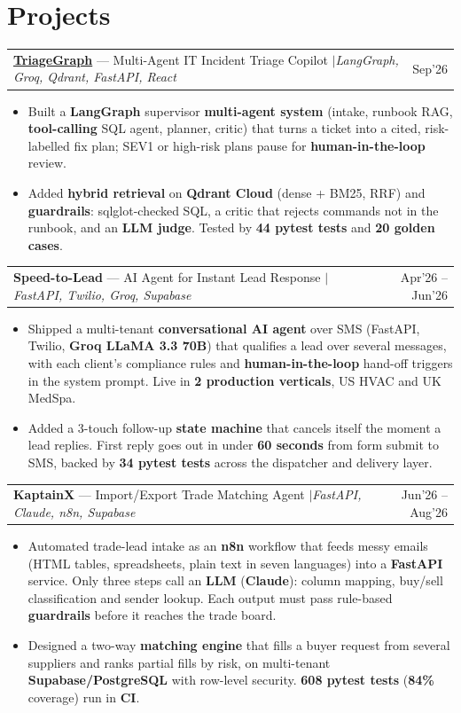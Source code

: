\documentclass[a4paper,10pt]{article}
\makeatletter
\newcommand{\entrygap}{\vspace{5pt}}
\newcommand{\sep}{\unskip\hspace{0.5em}$|$\hspace{0.5em}\ignorespaces}
\newcommand{\entry}[2]{%
  \begin{tabularx}{\linewidth}{@{}Xr@{}}#1 & #2\end{tabularx}\par}
\makeatother
\begin{document}
\section*{Projects}

\entry{\href{https://github.com/USERNAME/triagegraph}{\textbf{TriageGraph}} --- Multi-Agent IT Incident Triage Copilot \sep \textit{LangGraph, Groq, Qdrant, FastAPI, React}}{Sep'26}
\begin{itemize}
    \item Built a \textbf{LangGraph} supervisor \textbf{multi-agent system} (intake, runbook RAG, \textbf{tool-calling} SQL agent, planner, critic) that turns a ticket into a cited, risk-labelled fix plan; SEV1 or high-risk plans pause for \textbf{human-in-the-loop} review.
    \item Added \textbf{hybrid retrieval} on \textbf{Qdrant Cloud} (dense + BM25, RRF) and \textbf{guardrails}: sqlglot-checked SQL, a critic that rejects commands not in the runbook, and an \textbf{LLM judge}. Tested by \textbf{44 pytest tests} and \textbf{20 golden cases}.
\end{itemize}
\entrygap
\entry{\textbf{Speed-to-Lead} --- AI Agent for Instant Lead Response \sep \textit{FastAPI, Twilio, Groq, Supabase}}{Apr'26 -- Jun'26}
\begin{itemize}
    \item Shipped a multi-tenant \textbf{conversational AI agent} over SMS (FastAPI, Twilio, \textbf{Groq LLaMA 3.3 70B}) that qualifies a lead over several messages, with each client's compliance rules and \textbf{human-in-the-loop} hand-off triggers in the system prompt. Live in \textbf{2 production verticals}, US HVAC and UK MedSpa.
    \item Added a 3-touch follow-up \textbf{state machine} that cancels itself the moment a lead replies. First reply goes out in under \textbf{60 seconds} from form submit to SMS, backed by \textbf{34 pytest tests} across the dispatcher and delivery layer.
\end{itemize}
\entrygap
\entry{\textbf{KaptainX} --- Import/Export Trade Matching Agent \sep \textit{FastAPI, Claude, n8n, Supabase}}{Jun'26 -- Aug'26}
\begin{itemize}
    \item Automated trade-lead intake as an \textbf{n8n} workflow that feeds messy emails (HTML tables, spreadsheets, plain text in seven languages) into a \textbf{FastAPI} service. Only three steps call an \textbf{LLM} (\textbf{Claude}): column mapping, buy/sell classification and sender lookup. Each output must pass rule-based \textbf{guardrails} before it reaches the trade board.
    \item Designed a two-way \textbf{matching engine} that fills a buyer request from several suppliers and ranks partial fills by risk, on multi-tenant \textbf{Supabase/PostgreSQL} with row-level security. \textbf{608 pytest tests} (\textbf{84\%} coverage) run in \textbf{CI}.
\end{itemize}
\end{document}
